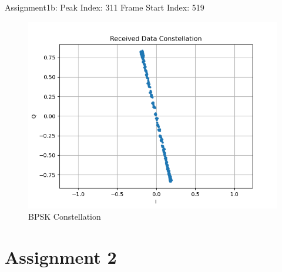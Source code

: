 \documentclass[
	letterpaper, %
	10pt, %
]{CSUniSchoolLabReport}
\begin{document}
Assignment1b:\newline
Peak Index:  311\newline
Frame Start Index:  519

\begin{figure}[H] %
	\centering %
	\includegraphics[width=1.2\textwidth]{assignment1b.png} %
	\caption{BPSK Constellation}
	\label{fig:block}
\end{figure}

\section{Assignment 2}
\end{document}
